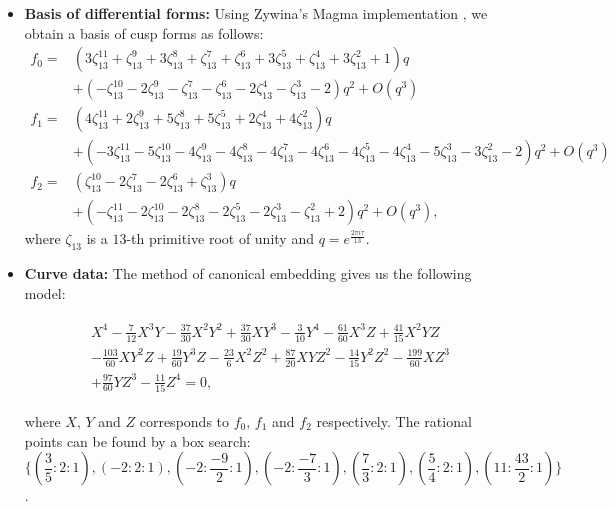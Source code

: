 \begin{itemize}



\item \textbf{Basis of differential forms:} Using Zywina's Magma implementation \cite{Zywina2020ComputingAO} , we obtain a basis of cusp forms as follows:
\begin{align*} f_0 = &(3\zeta_{13}^{11} + \zeta_{13}^9 + 3\zeta_{13}^8 + \zeta_{13}^7 + \zeta_{13}^6 + 3\zeta_{13}^5 + \zeta_{13}^4 + 3\zeta_{13}^2 + 1)q \\ &+ (-\zeta_{13}^{10} - 2\zeta_{13}^9 - \zeta_{13}^7 - \zeta_{13}^6 - 2\zeta_{13}^4 - \zeta_{13}^3 - 2)q^2 + O(q^3)\\ f_1 = &(4\zeta_{13}^{11} + 2\zeta_{13}^9 + 5\zeta_{13}^8 + 5\zeta_{13}^5 + 2\zeta_{13}^4 + 4\zeta_{13}^2)q \\ &+
        (-3\zeta_{13}^{11} - 5\zeta_{13}^{10} - 4\zeta_{13}^9 - 4\zeta_{13}^8 - 4\zeta_{13}^7 - 
        4\zeta_{13}^6 - 4\zeta_{13}^5 - 4\zeta_{13}^4 - 5\zeta_{13}^3 - 3\zeta_{13}^2 - 2)q^2 + O(q^3) \\ f_2 =  &(\zeta_{13}^{10} - 2\zeta_{13}^7 - 2\zeta_{13}^6 + \zeta_{13}^3)q \\ &+ (-\zeta_{13}^{11} - 2\zeta_{13}^{10} - 
        2\zeta_{13}^8 - 2\zeta_{13}^5 - 2\zeta_{13}^3 - \zeta_{13}^2 + 2)q^2 + O(q^3), \end{align*} where $\zeta_{13}$ is a $13$-th primitive root of unity and $q = e^{\frac{2\pi i\tau}{13}}$.
        
\item \textbf{Curve data:} The method of canonical embedding \cite{Galbraith_1996} gives us the following model:
        
        \begin{align*}\label{eq:cursed_curve}
\begin{split}
    &X^4 - \frac{7}{12}X^3Y - \frac{37}{30}X^2Y^2 + \frac{37}{30}XY^3 - \frac{3}{10}Y^4 - \frac{61}{60}X^3Z + \frac{41}{15}X^2YZ  \\
    &- \frac{103}{60}XY^2Z+ \frac{19}{60}Y^3Z - \frac{23}{6}X^2Z^2 + \frac{87}{20}XYZ^2 - \frac{14}{15}Y^2Z^2 - \frac{199}{60}XZ^3 \\
    &+ \frac{97}{60}YZ^3 - \frac{11}{15}Z^4 = 0,
\end{split}
\end{align*}
        
where $X,\,Y$ and $Z$ corresponds to $f_0,\,f_1$ and $f_2$ respectively. The rational points can be found by a box search: \[\{ (\frac{3}{5}:2:1), (-2:2:1), (-2:\frac{-9}{2}:1), (-2: \frac{-7}{3}:1), (\frac{7}{3}:2:1), (\frac{5}{4}: 2:1), (11: \frac{43}{2}:1) \}\].


\end{itemize}
